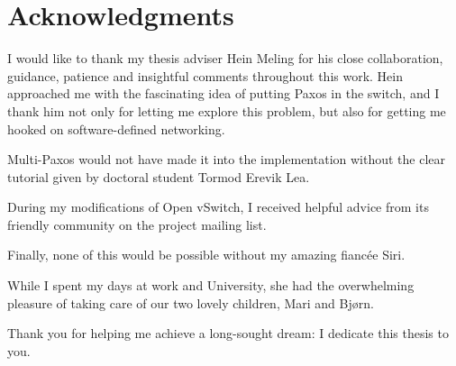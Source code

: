 \cleardoublepage%
\chapter*{Acknowledgments}%
\thispagestyle{empty}%

I would like to thank my thesis adviser Hein Meling for his close
collaboration, guidance, patience and insightful comments throughout this
work.
%
Hein approached me with the fascinating idea of putting Paxos in the
switch, and I thank him not only for letting me explore this problem, but
also for getting me hooked on software-defined networking.

Multi-Paxos would not have made it into the implementation without the
clear tutorial given by doctoral student Tormod Erevik Lea.

During my modifications of Open vSwitch, I received helpful advice from
its friendly community on the project mailing list.

Finally, none of this would be possible without my amazing fiancée Siri.

While I spent my days at work and University, she had the overwhelming
pleasure of taking care of our two lovely children, Mari and Bjørn.

Thank you for helping me achieve a long-sought dream: I dedicate this
thesis to you.
